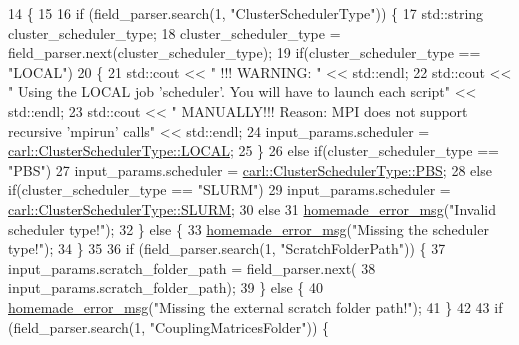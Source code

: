 \begin{DoxyCode}
14                                            \{
15 
16     \textcolor{keywordflow}{if} (field\_parser.search(1, \textcolor{stringliteral}{"ClusterSchedulerType"})) \{
17         std::string cluster\_scheduler\_type;
18         cluster\_scheduler\_type = field\_parser.next(cluster\_scheduler\_type);
19         \textcolor{keywordflow}{if}(cluster\_scheduler\_type == \textcolor{stringliteral}{"LOCAL"})
20         \{
21             std::cout << \textcolor{stringliteral}{" !!! WARNING: "} << std::endl;
22             std::cout << \textcolor{stringliteral}{"        Using the LOCAL job 'scheduler'. You will have to launch each script"} << 
      std::endl;
23             std::cout << \textcolor{stringliteral}{"     MANUALLY!!! Reason: MPI does not support recursive 'mpirun' calls"} << 
      std::endl;
24             input\_params.scheduler = \hyperlink{namespacecarl_a67066fdf35a0c326f5147098c0cf45d1a2bec097bc495ac4aacc355d3283f4b93}{carl::ClusterSchedulerType::LOCAL};
25         \}
26         \textcolor{keywordflow}{else} \textcolor{keywordflow}{if}(cluster\_scheduler\_type == \textcolor{stringliteral}{"PBS"})
27             input\_params.scheduler = \hyperlink{namespacecarl_a67066fdf35a0c326f5147098c0cf45d1adc92b93f87f72ed91ac097d8c15da06e}{carl::ClusterSchedulerType::PBS};
28         \textcolor{keywordflow}{else} \textcolor{keywordflow}{if}(cluster\_scheduler\_type == \textcolor{stringliteral}{"SLURM"})
29             input\_params.scheduler = \hyperlink{namespacecarl_a67066fdf35a0c326f5147098c0cf45d1a07a7582870a2087891d8eeaddf964ba0}{carl::ClusterSchedulerType::SLURM};
30         \textcolor{keywordflow}{else}
31             \hyperlink{common__header_8h_a05d65d26b911668ac90085745dca71f6}{homemade\_error\_msg}(\textcolor{stringliteral}{"Invalid scheduler type!"});
32     \} \textcolor{keywordflow}{else} \{
33         \hyperlink{common__header_8h_a05d65d26b911668ac90085745dca71f6}{homemade\_error\_msg}(\textcolor{stringliteral}{"Missing the scheduler type!"});
34     \}
35 
36     \textcolor{keywordflow}{if} (field\_parser.search(1, \textcolor{stringliteral}{"ScratchFolderPath"})) \{
37         input\_params.scratch\_folder\_path = field\_parser.next(
38                 input\_params.scratch\_folder\_path);
39     \} \textcolor{keywordflow}{else} \{
40         \hyperlink{common__header_8h_a05d65d26b911668ac90085745dca71f6}{homemade\_error\_msg}(\textcolor{stringliteral}{"Missing the external scratch folder path!"});
41     \}
42 
43     \textcolor{keywordflow}{if} (field\_parser.search(1, \textcolor{stringliteral}{"CouplingMatricesFolder"})) \{

\end{DoxyCode}
